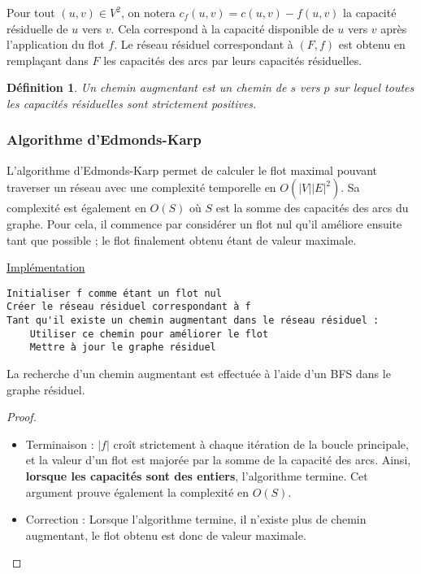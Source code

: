 \documentclass[11pt,a4paper]{article}
\newtheorem*{definition}{Définition}
\begin{document}
Pour tout \((u,v) \in V^2\), on notera \(c_f(u,v) = c(u,v) - f(u,v)\) la capacité résiduelle de \(u\) vers \(v\). Cela correspond à la capacité disponible de \(u\) vers \(v\) après l'application du flot \(f\). Le réseau résiduel correspondant à \((F,f)\) est obtenu en remplaçant dans \(F\) les capacités des arcs par leurs capacités résiduelles.

\begin{definition}
  Un chemin augmentant est un chemin de \(s\) vers \(p\) sur lequel toutes les capacités résiduelles sont strictement positives.
\end{definition}


    \subsubsection{Algorithme d'Edmonds-Karp}
L'algorithme d'Edmonds-Karp permet de calculer le flot maximal pouvant traverser un réseau avec une complexité temporelle en \(O(|V| |E|^2)\). Sa complexité est également en \(O(S)\) où \(S\) est la somme des capacités des arcs du graphe. Pour cela, il commence par considérer un flot nul qu'il améliore ensuite tant que possible ; le flot finalement obtenu étant de valeur maximale.

\noindent\href{https://github.com/AdrienVannson/algo-lib/blob/master/include/graphs/algorithms/edmonds-karp.hpp}{Implémentation}
\begin{lstlisting}
Initialiser f comme étant un flot nul
Créer le réseau résiduel correspondant à f
Tant qu'il existe un chemin augmentant dans le réseau résiduel :
    Utiliser ce chemin pour améliorer le flot
    Mettre à jour le graphe résiduel
\end{lstlisting}

La recherche d'un chemin augmentant est effectuée à l'aide d'un BFS dans le graphe résiduel.

\begin{proof} \leavevmode
  \begin{itemize}
    \item Terminaison : \(|f|\) croît strictement à chaque itération de la boucle principale, et la valeur d'un flot est majorée par la somme de la capacité des arcs. Ainsi, \textbf{lorsque les capacités sont des entiers}, l'algorithme termine. Cet argument prouve également la complexité en \(O(S)\).
    \item Correction : Lorsque l'algorithme termine, il n'existe plus de chemin augmentant, le flot obtenu est donc de valeur maximale.
  \end{itemize}
\end{proof}
\end{document}
